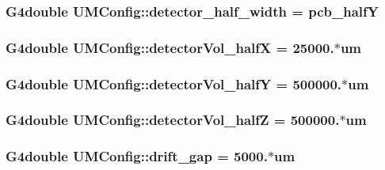 \subsubsection[{detector\+\_\+half\+\_\+width}]{\setlength{\rightskip}{0pt plus 5cm}G4double U\+M\+Config\+::detector\+\_\+half\+\_\+width = {\bf pcb\+\_\+half\+Y}}\label{structUMConfig_a74bcad30686f23899c8b0326a30d95b0}
\hypertarget{structUMConfig_aeb4e8d73f0c6f7e7993e7e5af94471b4}{}
\subsubsection[{detector\+Vol\+\_\+half\+X}]{\setlength{\rightskip}{0pt plus 5cm}G4double U\+M\+Config\+::detector\+Vol\+\_\+half\+X = 25000.$\ast$um}\label{structUMConfig_aeb4e8d73f0c6f7e7993e7e5af94471b4}
\hypertarget{structUMConfig_ad7c30cbfc9df06a290bcffe70f3d8b41}{}
\subsubsection[{detector\+Vol\+\_\+half\+Y}]{\setlength{\rightskip}{0pt plus 5cm}G4double U\+M\+Config\+::detector\+Vol\+\_\+half\+Y = 500000.$\ast$um}\label{structUMConfig_ad7c30cbfc9df06a290bcffe70f3d8b41}
\hypertarget{structUMConfig_ad9353827387f9222f0dbd881b0dd2746}{}
\subsubsection[{detector\+Vol\+\_\+half\+Z}]{\setlength{\rightskip}{0pt plus 5cm}G4double U\+M\+Config\+::detector\+Vol\+\_\+half\+Z = 500000.$\ast$um}\label{structUMConfig_ad9353827387f9222f0dbd881b0dd2746}
\hypertarget{structUMConfig_aa26902f3f2f43975c6c26b2f1addc301}{}
\subsubsection[{drift\+\_\+gap}]{\setlength{\rightskip}{0pt plus 5cm}G4double U\+M\+Config\+::drift\+\_\+gap = 5000.$\ast$um}\label{structUMConfig_aa26902f3f2f43975c6c26b2f1addc301}
\hypertarget{structUMConfig_aafe2777462b266d6e826f29780f41734}{}
